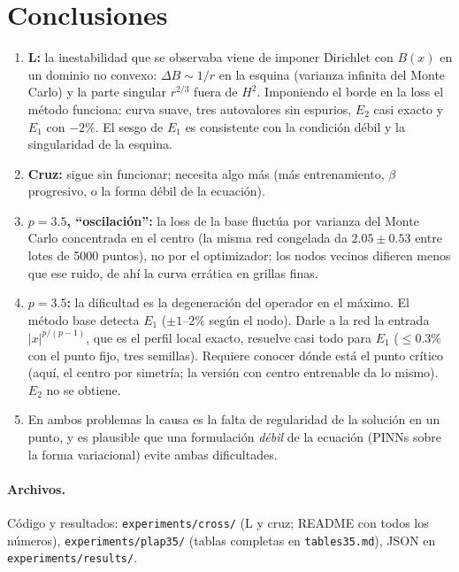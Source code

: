 \documentclass[11pt,a4paper]{article}
\begin{document}
\section{Conclusiones}
\begin{enumerate}
\item \textbf{L:} la inestabilidad que se observaba viene de imponer Dirichlet con $B(x)$ en un dominio no convexo:
$\Delta B\sim1/r$ en la esquina (varianza infinita del Monte Carlo) y la parte singular $r^{2/3}$ fuera de $H^2$.
Imponiendo el borde en la loss el método funciona: curva suave, tres autovalores sin espurios, $E_2$ casi exacto y $E_1$ con
$-2\%$. El sesgo de $E_1$ es consistente con la condición débil y la singularidad de la esquina.
\item \textbf{Cruz:} sigue sin funcionar; necesita algo más (más entrenamiento, $\beta$ progresivo, o la forma débil de la
ecuación).
\item \textbf{$p=3.5$, ``oscilación'':} la loss de la base fluctúa por varianza del Monte Carlo concentrada en el centro
(la misma red congelada da $2.05\pm0.53$ entre lotes de 5000 puntos), no por el optimizador; los nodos vecinos difieren
menos que ese ruido, de ahí la curva errática en grillas finas.
\item \textbf{$p=3.5$:} la dificultad es la degeneración del operador en el máximo. El método base detecta $E_1$
($\pm1$--$2\%$ según el nodo). Darle a la red la entrada $|x|^{p/(p-1)}$, que es el perfil local exacto, resuelve casi todo
para $E_1$ ($\le0.3\%$ con el punto fijo, tres semillas). Requiere conocer dónde está el punto crítico (aquí, el centro por
simetría; la versión con centro entrenable da lo mismo). $E_2$ no se obtiene.
\item En ambos problemas la causa es la falta de regularidad de la solución en un punto, y es plausible que una formulación
\emph{débil} de la ecuación (PINNs sobre la forma variacional) evite ambas dificultades.
\end{enumerate}

\paragraph{Archivos.} Código y resultados: \texttt{experiments/cross/} (L y cruz; README con todos los números),
\texttt{experiments/plap35/} (tablas completas en \texttt{tables35.md}), JSON en \texttt{experiments/results/}.
\end{document}
